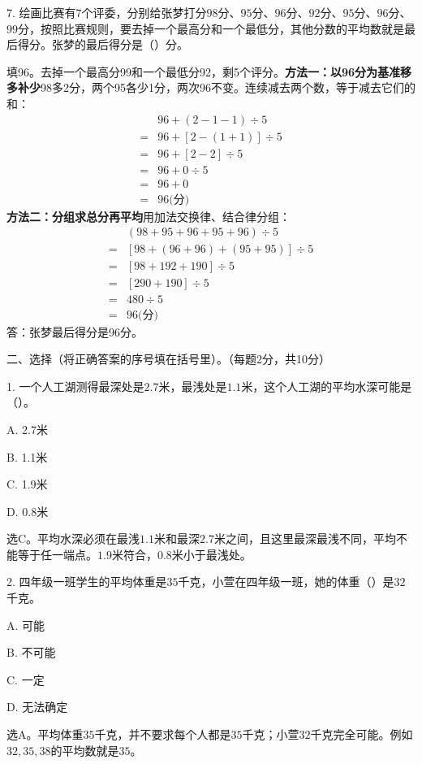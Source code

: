 7. 绘画比赛有\(7\)个评委，分别给张梦打分\(98\)分、\(95\)分、\(96\)分、\(92\)分、\(95\)分、\(96\)分、\(99\)分，按照比赛规则，要去掉一个最高分和一个最低分，其他分数的平均数就是最后得分。张梦的最后得分是（\hspace{1.8em}）分。\par
\begin{BookAnswer}
填96。去掉一个最高分99和一个最低分92，剩5个评分。\textbf{方法一：以96分为基准移多补少}98多2分，两个95各少1分，两次96不变。连续减去两个数，等于减去它们的和：\[\begin{aligned}&96+(2-1-1)\div5\\={}&96+[2-(1+1)]\div5\\={}&96+[2-2]\div5\\={}&96+0\div5\\={}&96+0\\={}&96\text{(分)}\end{aligned}\]\textbf{方法二：分组求总分再平均}用加法交换律、结合律分组：\[\begin{aligned}&(98+95+96+95+96)\div5\\={}&[98+(96+96)+(95+95)]\div5\\={}&[98+192+190]\div5\\={}&[290+190]\div5\\={}&480\div5\\={}&96\text{(分)}\end{aligned}\]答：张梦最后得分是96分。
\end{BookAnswer}

二、选择（将正确答案的序号填在括号里）。（每题2分，共10分）\par 1. 一个人工湖测得最深处是\(2.7\)米，最浅处是\(1.1\)米，这个人工湖的平均水深可能是（\hspace{1.8em}）。\par
\noindent A. 2.7米\par
\noindent B. 1.1米\par
\noindent C. 1.9米\par
\noindent D. 0.8米\par
\begin{BookAnswer}
选C。平均水深必须在最浅\(1.1\)米和最深\(2.7\)米之间，且这里最深最浅不同，平均不能等于任一端点。\(1.9\)米符合，\allowbreak{}\(0.8\)米小于最浅处。
\end{BookAnswer}

2. 四年级一班学生的平均体重是\(35\)千克，小萱在四年级一班，她的体重（\hspace{1.8em}）是\(32\)千克。\par
\noindent A. 可能\par
\noindent B. 不可能\par
\noindent C. 一定\par
\noindent D. 无法确定\par
\begin{BookAnswer}
选A。平均体重\(35\)千克，并不要求每个人都是\(35\)千克；小萱\(32\)千克完全可能。例如\(32,35,38\)的平均数就是\(35\)。
\end{BookAnswer}

